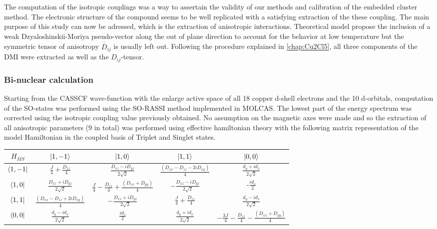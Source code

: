 \documentclass[10pt]{report}
\numberwithin{equation}{section}
\begin{document}
The computation of the isotropic couplings was a way to assertain the validity of our methods and calibration of the embedded cluster method.
The electronic structure of the compound seems to be well replicated with a satisfying extraction of the these coupling.
The main purpose of this study can now be adressed, which is the extraction of anisotropic interactions.
Theoretical model propose the inclusion of a weak Dzyaloshinskii-Moriya pseudo-vector along the out of plane direction to account for the behavior at low temperature but the symmetric tensor of anisotropy $\overline{\overline{D}}_{ij}$ is usually left out.
Following the procedure explained in \ref{chap:Cu2Cl5}, all three components of the DMI were extracted as well as the $D_{ij}$-tensor.

\subsubsection*{Bi-nuclear calculation}

Starting from the CASSCF wave-function with the enlarge active space of all 18 copper d-shell electrons and the 10 d-orbitals, computation of the SO-states was performed using the SO-RASSI method implemented in MOLCAS.
The lowest part of the energy spectrum was corrected using the isotropic coupling value previously obtained.
No assumption on the magnetic axes were made and so the extraction of all anisotropic parameters (9 in total) was performed using effective hamiltonian theory with the following matrix representation of the model Hamiltonian in the coupled basis of Triplet and Singlet states.

\begin{center}
    \begin{tabular}{c | c c c c}
        $H_{MS}$ & $\ket{1,-1}$ & $\ket{1,0}$ & $\ket{1,1}$ & $\ket{0,0}$\\
        \hline
        $\bra{1,-1}$ & $\frac{J}{4}+\frac{D_{zz}}{4}$ & $\frac{D_{xz}-iD_{yz}}{2\sqrt{2}}$ & $\frac{(D_{xx}-D_{zz}-2iD_{xy})}{4} $& $\frac{d_y+id_x}{2\sqrt{2}}$\\
        $\bra{1,0}$ & $\frac{D_{xz}+iD_{yz}}{2\sqrt{2}}$ &$ \frac{J}{4} -\frac{D_{zz}}{4} +\frac{(D_{xx}+D_{yy})}{4}$& $-\frac{D_{xz}-iD_{yz}}{2\sqrt{2}}$ & -$\frac{id_z}{2}$ \\
        $\bra{1,1}$ &$\frac{(D_{xx}-D_{zz}+2iD_{xy})}{4} $ & $-\frac{D_{xz}+iD_{yz}}{2\sqrt{2}}$ & $\frac{J}{4}+\frac{D_{zz}}{4}$ & $\frac{d_y-id_x}{2\sqrt{2}}$\\
        $\bra{0,0}$ & $\frac{d_y-id_x}{2\sqrt{2}}$  & $\frac{id_z}{2}$  &$\frac{d_y+id_x}{2\sqrt{2}}$  & $-\frac{3J}{4}-\frac{D_{zz}}{4}-\frac{(D_{xx}+D_{yy})}{4}$\\
    \end{tabular}
\end{center}
\end{document}
